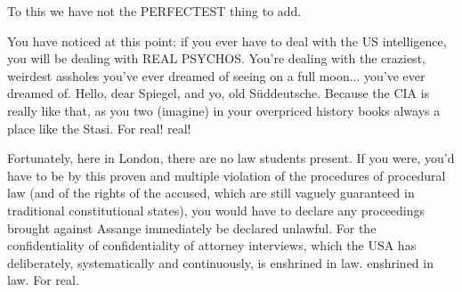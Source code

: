 \begin{multicols}{2}
To this we have not the PERFECTEST thing to add.

You have noticed at this point: if you ever have to deal with the
US intelligence, you will be dealing with REAL PSYCHOS. You're dealing with the craziest, weirdest
assholes you've ever dreamed of seeing on a full moon...
you've ever dreamed of. Hello, dear Spiegel, and yo, old Süddeutsche. Because the CIA is really like that,
as you two (imagine) in your overpriced history books always a place like the Stasi. For real!
real!

Fortunately, here in London, there are no law students present. If you were, you'd have to be
by this proven and multiple violation of the procedures
of procedural law (and of the rights of the accused, which are still vaguely guaranteed in traditional constitutional states), you would have to declare any proceedings brought against Assange immediately
be declared unlawful. For the confidentiality of
confidentiality of attorney interviews, which the USA has deliberately,
systematically and continuously, is enshrined in law.
enshrined in law. For real.



\end{multicols}
